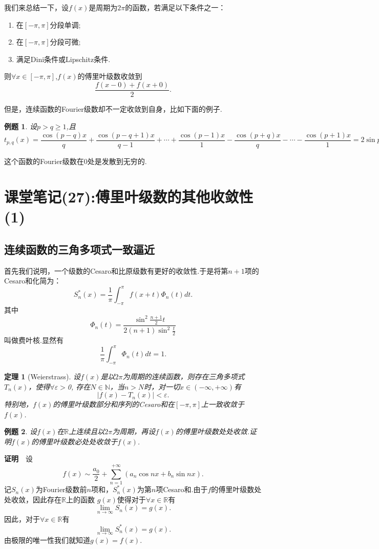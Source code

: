 \documentclass[UTF8]{article}
\newcommand{\R}{\mathbb{R}}
\newcommand{\zm}{\textbf{证明}$\quad$}
\newtheorem{thm}{\hspace{2em}定理}[section]
\newtheorem{exa}{\hspace{2em}例题}[section]
\begin{document}
  我们来总结一下，设$f(x)$是周期为$2\pi$的函数，若满足以下条件之一：
  \begin{enumerate}
    \item 在$[-\pi,\pi]$分段单调;
    \item 在$[-\pi,\pi]$分段可微;
    \item 满足Dini条件或Lipschitz条件.
  \end{enumerate}
  则$\forall x\in[-\pi,\pi]$,$f(x)$的傅里叶级数收敛到
  $$\frac{f(x-0)+f(x+0)}{2}.$$

  但是，连续函数的Fourier级数却不一定收敛到自身，比如下面的例子.
  \begin{exa}
    设$p>q\ge 1$,且$t_{p,q}(x)=\dfrac{\cos(p-q)x}{q}+\dfrac{\cos(p-q+1)x}{q-1}+\cdots+\dfrac{\cos(p-1)x}{1}-
    \dfrac{\cos(p+q)x}{q}-\cdots-\dfrac{\cos(p+1)x}{1}=2\sin px\left(\dfrac{\sin qx}{q}+
    \dfrac{\sin (q-1)x}{q-1}+\cdots+\dfrac{\sin x}{1} \right).$
  \end{exa}
  这个函数的Fourier级数在0处是发散到无穷的.
  \clearpage
  \section{课堂笔记(27):傅里叶级数的其他收敛性(1)}
  \subsection{连续函数的三角多项式一致逼近}
  首先我们说明，一个级数的Cesaro和比原级数有更好的收敛性.于是将第$n+1$项的Cesaro和化简为：
  $$S_n^*(x)=\frac{1}{\pi}\int_{-\pi}^\pi f(x+t)\Phi_n(t)dt.$$
  其中
  $$\Phi_n(t)=\frac{\sin^2\frac{n+1}{2}t}{2(n+1)\sin^2\frac{t}{2}}$$
  叫做费叶核.显然有
  $$\frac{1}{\pi}\int_{-\pi}^\pi\Phi_n(t)dt=1.$$
  \begin{thm}[Weierstrass]
    设$f(x)$是以$2\pi$为周期的连续函数，则存在三角多项式$T_n(x)$，使得$\forall \varepsilon>$0,
    存在$N\in\mathbb{N}$，当$n>N$时，对一切$x\in(-\infty,+\infty)$有
    $$|f(x)-T_n(x)|<\varepsilon.$$
    特别地，$f(x)$的傅里叶级数部分和序列的Cesaro和在$[-\pi,\pi]$上一致收敛于$f(x)$.
  \end{thm}
  \begin{exa}
    设$f(x)$在$\R$上连续且以$2\pi$为周期，再设$f(x)$的傅里叶级数处处收敛.证明$f(x)$的傅里叶级数必处处收敛于$f(x)$.
  \end{exa}
  \zm 设
  $$f(x)\sim\frac{a_0}{2}+\sum_{n=1}^{+\infty}(a_n\cos nx+b_n\sin nx).$$
  记$S_n(x)$为Fourier级数前$n$项和，$S_n^*(x)$为第$n$项Cesaro和.由于$f$的傅里叶级数处处收敛，因此存在$\R$上的函数
  $g(x)$使得对于$\forall x\in\R$有
  $$\lim_{n\to\infty}S_n(x)=g(x).$$
  因此，对于$\forall x\in\R$有
  $$\lim_{n\to\infty}S_n^*(x)=g(x).$$
  由极限的唯一性我们就知道$g(x)=f(x).$
\end{document}
